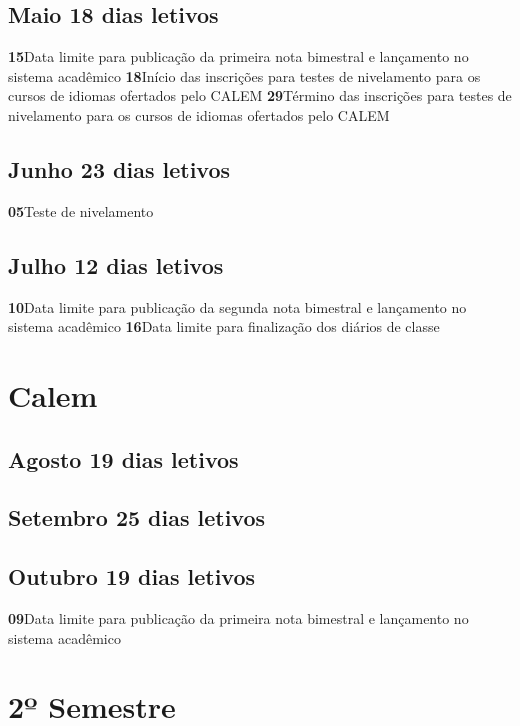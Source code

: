 \documentclass[thesis]{hmcposter}
\begin{document}
\begin{poster}
								\subsection{Maio \hfill 18 dias letivos}\textbf{15}\qquad Data limite para publicação da primeira nota bimestral e lançamento no sistema acadêmico \newline \null\textbf{18}\qquad Início das inscrições para testes de nivelamento para os cursos de
idiomas ofertados pelo CALEM \newline \null\textbf{29}\qquad Término das inscrições para testes de nivelamento para os cursos
de idiomas ofertados pelo CALEM \newline \null\subsection{Junho \hfill 23 dias letivos}\textbf{05}\qquad Teste de nivelamento \newline \null\subsection{Julho \hfill 12 dias letivos}\textbf{10}\qquad Data limite para publicação da segunda nota bimestral e lançamento no sistema acadêmico \newline \null\textbf{16}\qquad Data limite para finalização dos diários de classe \newline \null\newpage
\section{\color{hmcorange}Calem}\subsection{Agosto \hfill 19 dias letivos}\subsection{Setembro \hfill 25 dias letivos}\subsection{Outubro \hfill 19 dias letivos}\textbf{09}\qquad Data limite para publicação da primeira nota bimestral e lançamento no sistema acadêmico \newline \null\vfill\null
\columnbreak
\section{\hfill \color{hmcorange}2º Semestre}

\end{poster}
\end{document}
